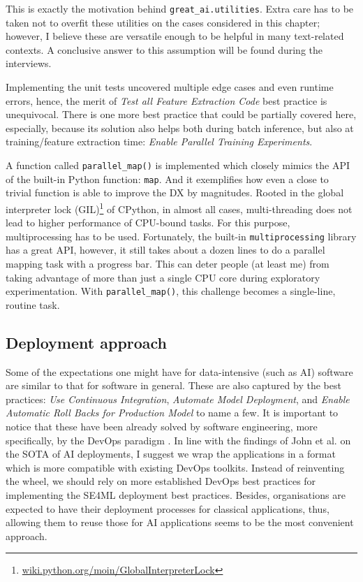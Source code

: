 This is exactly the motivation behind \texttt{great\_ai.utilities}. Extra care has to be taken not to overfit these utilities on the cases considered in this chapter; however, I believe these are versatile enough to be helpful in many text-related contexts. A conclusive answer to this assumption will be found during the interviews.

Implementing the unit tests uncovered multiple edge cases and even runtime errors, hence, the merit of \textit{Test all Feature Extraction Code} best practice is unequivocal. There is one more best practice that could be partially covered here, especially, because its solution also helps both during batch inference, but also at training/feature extraction time: \textit{Enable Parallel Training Experiments}.

A function called \texttt{parallel\_map()} is implemented which closely mimics the API of the built-in Python function: \texttt{map}. And it exemplifies how even a close to trivial function is able to improve the DX by magnitudes. Rooted in the global interpreter lock (GIL)\footnote{\href{https://wiki.python.org/moin/GlobalInterpreterLock}{wiki.python.org/moin/GlobalInterpreterLock}} of CPython, in almost all cases, multi-threading does not lead to higher performance of CPU-bound tasks. For this purpose, multiprocessing has to be used. Fortunately, the built-in \texttt{multiprocessing} library has a great API, however, it still takes about a dozen lines to do a parallel mapping task with a progress bar. This can deter people (at least me) from taking advantage of more than just a single CPU core during exploratory experimentation. With \texttt{parallel\_map()}, this challenge becomes a single-line, routine task. 

\subsection{Deployment approach}

Some of the expectations one might have for data-intensive (such as AI) software are similar to that for software in general. These are also captured by the best practices: \textit{Use Continuous Integration}, \textit{Automate Model Deployment}, and \textit{Enable Automatic Roll Backs for Production Model} to name a few. It is important to notice that these have been already solved by software engineering, more specifically, by the DevOps paradigm \cite{leite2019survey}. 
In line with the findings of John et al. \cite{john2020architecting} on the SOTA of AI deployments, I suggest we wrap the applications in a format which is more compatible with existing DevOps toolkits. Instead of reinventing the wheel, we should rely on more established DevOps best practices for implementing the SE4ML deployment best practices. Besides, organisations are expected to have their deployment processes for classical applications, thus, allowing them to reuse those for AI applications seems to be the most convenient approach.

